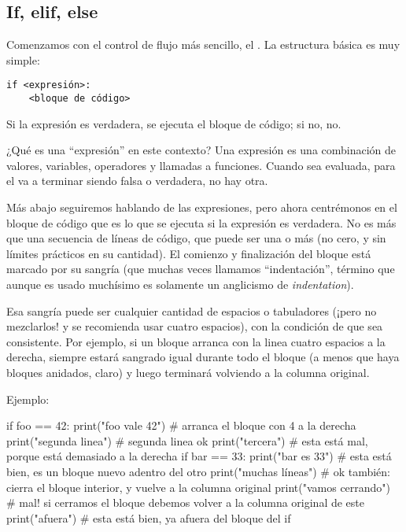 \subsection{If, elif, else}\label{sub:if}

Comenzamos con el control de flujo más sencillo, el . La estructura básica es muy simple:

\begin{verbatim}
if <expresión>:
    <bloque de código>
\end{verbatim}

Si la expresión es verdadera, se ejecuta el bloque de código; si no, no.

¿Qué es una ``expresión'' en este contexto? Una expresión es una combinación de valores, variables, operadores y llamadas a funciones. Cuando sea evaluada, para el  va a terminar siendo falsa o verdadera, no hay otra. 

Más abajo seguiremos hablando de las expresiones, pero ahora centrémonos en el bloque de código que es lo que se ejecuta si la expresión es verdadera. No es más que una secuencia de líneas de código, que puede ser una o más (no cero, y sin límites prácticos en su cantidad). El comienzo y finalización del bloque está marcado por su sangría (que muchas veces llamamos ``indentación'', término que aunque es usado muchísimo es solamente un anglicismo de \textit{indentation}).

Esa sangría puede ser cualquier cantidad de espacios o tabuladores (¡pero no mezclarlos! y se recomienda usar cuatro espacios), con la condición de que sea consistente. Por ejemplo, si un bloque arranca con la linea cuatro espacios a la derecha, siempre estará sangrado igual durante todo el bloque (a menos que haya bloques anidados, claro) y luego terminará volviendo a la columna original.

Ejemplo:

\begin{py}
if foo == 42:
    print("foo vale 42")  # arranca el bloque con 4 a la derecha
    print("segunda linea")  # segunda linea ok
      print("tercera")  # esta está mal, porque está demasiado a la derecha
    if bar == 33:
        print("bar es 33")  # esta está bien, es un bloque nuevo adentro del otro
    print("muchas líneas")  # ok también: cierra el bloque interior, y vuelve a la columna original
  print("vamos cerrando")  # mal! si cerramos el bloque debemos volver a la columna original de este
print("afuera")  # esta está bien, ya afuera del bloque del if
\end{py}

